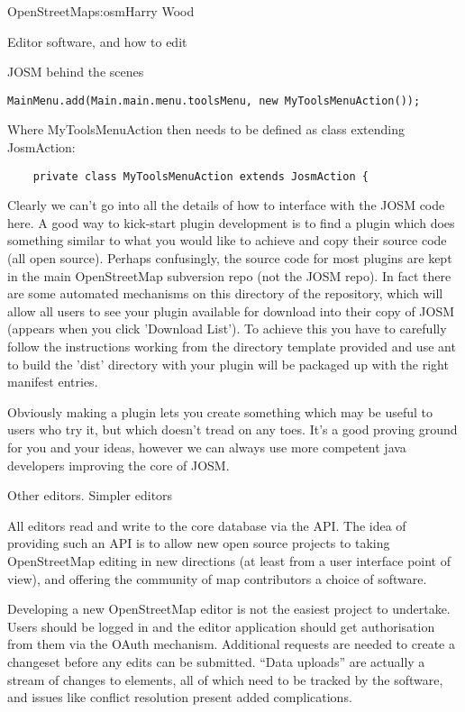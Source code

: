 \begin{aosachapter}{OpenStreetMap}{s:osm}{Harry Wood}
\begin{aosasect1}{Editor software, and how to edit}
\begin{aosasect2}{JOSM behind the scenes}
\begin{verbatim}
MainMenu.add(Main.main.menu.toolsMenu, new MyToolsMenuAction());
\end{verbatim}

Where MyToolsMenuAction then needs to be defined as class extending JosmAction:

\begin{verbatim}
    private class MyToolsMenuAction extends JosmAction {
\end{verbatim}

Clearly we can't go into all the details of how to interface with the
JOSM code here. A good way to kick-start plugin development is to find
a plugin which does something similar to what you would like to
achieve and copy their source code (all open source). Perhaps
confusingly, the source code for most plugins are kept in the main
OpenStreetMap subversion repo (not the JOSM repo). In fact there are
some automated mechanisms on this directory of the repository, which
will allow all users to see your plugin available for download into
their copy of JOSM (appears when you click 'Download List'). To
achieve this you have to carefully follow the instructions working
from the directory template provided and use ant to build the 'dist'
directory with your plugin will be packaged up with the right manifest
entries.

Obviously making a plugin lets you create something which may be
useful to users who try it, but which doesn't tread on any toes. It's
a good proving ground for you and your ideas, however we can always
use more competent java developers improving the core of JOSM.

\end{aosasect2}

\begin{aosasect2}{Other editors. Simpler editors}

All editors read and write to the core database via the API. The idea
of providing such an API is to allow new open source projects to
taking OpenStreetMap editing in new directions (at least from a user
interface point of view), and offering the community of map
contributors a choice of software.

Developing a new OpenStreetMap editor is not the easiest project to
undertake. Users should be logged in and the editor application should
get authorisation from them via the OAuth mechanism. Additional
requests are needed to create a changeset before any edits can be
submitted. ``Data uploads'' are actually a stream of changes to
elements, all of which need to be tracked by the software, and issues
like conflict resolution present added complications.


\end{aosasect2}
\end{aosasect1}
\end{aosachapter}
